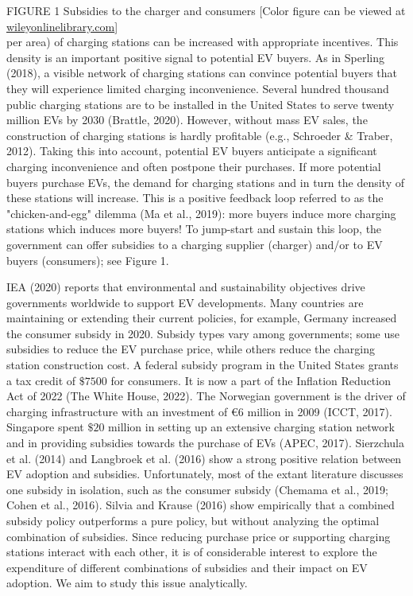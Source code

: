 \documentclass[10pt]{article}
\begin{document}
FIGURE 1 Subsidies to the charger and consumers [Color figure can be viewed at \href{http://wileyonlinelibrary.com}{wileyonlinelibrary.com}]\\
per area) of charging stations can be increased with appropriate incentives. This density is an important positive signal to potential EV buyers. As in Sperling (2018), a visible network of charging stations can convince potential buyers that they will experience limited charging inconvenience. Several hundred thousand public charging stations are to be installed in the United States to serve twenty million EVs by 2030 (Brattle, 2020). However, without mass EV sales, the construction of charging stations is hardly profitable (e.g., Schroeder \& Traber, 2012). Taking this into account, potential EV buyers anticipate a significant charging inconvenience and often postpone their purchases. If more potential buyers purchase EVs, the demand for charging stations and in turn the density of these stations will increase. This is a positive feedback loop referred to as the "chicken-and-egg" dilemma (Ma et al., 2019): more buyers induce more charging stations which induces more buyers! To jump-start and sustain this loop, the government can offer subsidies to a charging supplier (charger) and/or to EV buyers (consumers); see Figure 1.

IEA (2020) reports that environmental and sustainability objectives drive governments worldwide to support EV developments. Many countries are maintaining or extending their current policies, for example, Germany increased the consumer subsidy in 2020. Subsidy types vary among governments; some use subsidies to reduce the EV purchase price, while others reduce the charging station construction cost. A federal subsidy program in the United States grants a tax credit of $\$ 7500$ for consumers. It is now a part of the Inflation Reduction Act of 2022 (The White House, 2022). The Norwegian government is the driver of charging infrastructure with an investment of $€ 6$ million in 2009 (ICCT, 2017). Singapore spent $\$ 20$ million in setting up an extensive charging station network and in providing subsidies towards the purchase of EVs (APEC, 2017). Sierzchula et al. (2014) and Langbroek et al. (2016) show a strong positive relation between EV adoption and subsidies. Unfortunately, most of the extant literature discusses one subsidy in isolation, such as the consumer subsidy (Chemama et al., 2019; Cohen et al., 2016). Silvia and Krause (2016) show empirically that a combined subsidy policy outperforms a pure policy, but without analyzing the optimal combination of subsidies. Since reducing purchase price or supporting charging stations interact with each other, it is of considerable interest to explore the expenditure of different combinations of subsidies and their impact on EV adoption. We aim to study this issue analytically.
\end{document}
